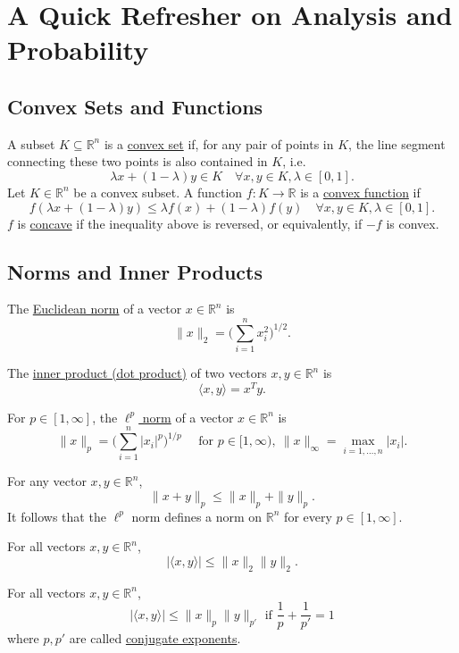 \section{A Quick Refresher on Analysis and Probability}



\subsection{Convex Sets and Functions}

A subset $K \subseteq \mathbb{R}^n$ is a \underline{convex set} if, for any pair of points in $K$, the line 
segment connecting these two points is also contained in $K$, i.e. 
\[ \lambda x + (1 - \lambda) y \in K \quad \forall x, y \in K, \lambda \in [0, 1]. \]
Let $K \in \mathbb{R}^n$ be a convex subset. A function $f: K \to \mathbb{R}$ is a \underline{convex 
function} if 
\[ f(\lambda x + (1 - \lambda) y) \leq \lambda f(x) + (1 - \lambda) f(y) \quad \forall x, y \in K, 
\lambda \in [0, 1]. \]	
$f$ is \underline{concave} if the inequality above is reversed, or equivalently, if $-f$ is convex.



\subsection{Norms and Inner Products}

The \underline{Euclidean norm} of a vector $x \in \mathbb{R}^n$ is 
\[ \|x\|_2 = \biggl( \sum_{i = 1}^{n} x_i^2 \biggr)^{1/2}. \]

The \underline{inner product (dot product)} of two vectors $x, y \in \mathbb{R}^n$ is 
\[ \langle x, y \rangle = x^T y. \]

For $p \in [1, \infty]$, the \underline{$\ell^p$ norm} of a vector $x \in \mathbb{R}^n$ is 
\[ \|x\|_p = \biggl( \sum_{i = 1}^{n} |x_i|^p \biggr)^{1/p} \quad \text{ for } p \in [1, \infty), 
\ \|x\|_{\infty} = \max_{i = 1, \dots, n} |x_i|. \]

For any vector $x, y \in \mathbb{R}^n$, 
\[ \|x + y\|_p \leq \|x\|_p + \|y\|_p. \]
It follows that the $\ell^p$ norm defines a norm on $\mathbb{R}^n$  for every $p \in [1, \infty]$.

For all vectors $x, y \in \mathbb{R}^n$, 
\[ |\langle x, y \rangle| \leq \lVert x \rVert_{2} \lVert y \rVert_{2}. \]

For all vectors $x, y \in \mathbb{R}^n$, 
\[ |\langle x, y \rangle| \leq \lVert x \rVert_{p} \lVert y \rVert_{p'} \text{ if } 
\frac{1}{p} + \frac{1}{p'} = 1 \]
where $p, p'$ are called \underline{conjugate exponents}.



